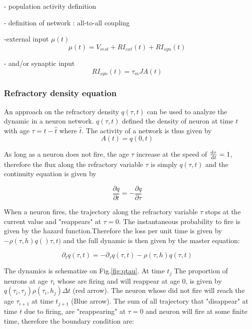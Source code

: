 \documentclass[a4paper,11pt,twoside]{article}
\def \dd  {{\rm d}}
\numberwithin{equation}{section}
\begin{document}
- population activity definition

- definition of network : all-to-all coupling

-external input $\mu(t)$
\begin{equation}
\label{eq:mu}
\mu(t)=V_{rest}+RI_{ext}(t)+RI_{syn}(t)
\end{equation}

- and/or synaptic input
\begin{equation}
\label{eq:input}
RI_{syn}(t)=\tau_mJA(t)
\end{equation}

\subsubsection{Refractory density equation}

An approach on the refractory density $q(\tau,t) $ can be used to analyze the dynamic in a neuron network. $q(\tau,t)$ defined the density of neuron at time $t$ with age $\tau=t-\hat{t}$ where $\hat{t}$. The activity of a network is thus given by
\begin{equation}
\label{eq:A}
A(t)=q(0,t)
\end{equation}

As long as a neuron does not fire, the age $\tau$ increase at the speed of $\frac{\dd \tau}{\dd t}=1$, therefore the flux along the refractory variable $\tau$ is simply $q(\tau,t)$ and the continuity equation  is given by

\begin{equation}
\label{eq:continuity1}
\frac{\partial q}{\partial t}=-\frac{\partial q}{\partial \tau}
\end{equation}

When a neuron fires, the trajectory along the refractory variable $\tau$ stops at the current value and "reappears" at $\tau=0$. The instantaneous probability to fire is given by the hazard function.Therefore the loss per unit time is given by $-\rho(\tau,h)q()\tau,t)$ and the full dynamic is then given by the master equation:

\begin{equation}
\label{eq:masterequation}
\partial_t q(\tau,t)=-\partial_\tau q(\tau,t)-\rho(\tau,h)q(\tau,t)
\end{equation}

The dynamics is schematize on Fig.\ref{fig:qtau}. At time $t_j$ The proportion of neurons at age $\tau_i$ whose are firing and will reappear at age $0$, is given by$q(\tau_i,\tau_j)\rho(\tau_i,h_j)\Delta t$ (red arrow). The neuron whose did not fire will reach the age $\tau_{i+1}$ at time $t_{j+1}$ (Blue arrow). The sum of all trajectory that "disappear" at time $t$ due to firing, are "reappearing" at $\tau=0$ and  neuron will fire at some finite time, therefore the boundary condition are:
\end{document}
